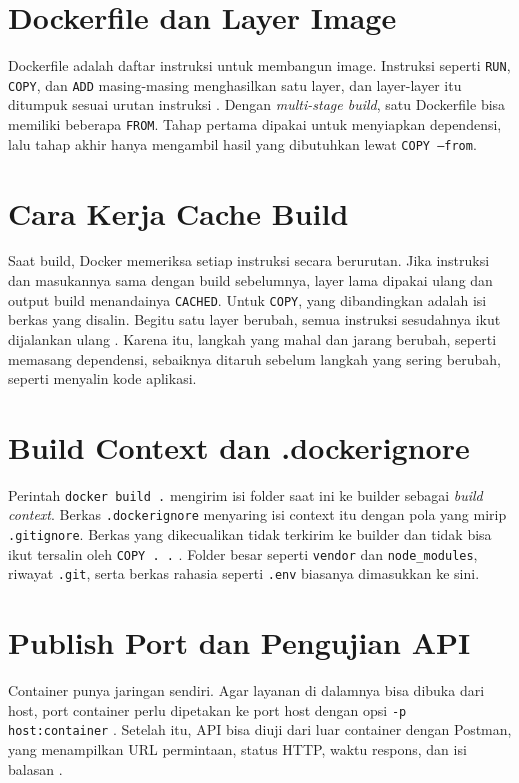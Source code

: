 \documentclass[a4paper,oneside,12pt]{report}
\begin{document}
\section{Dockerfile dan Layer Image}
Dockerfile adalah daftar instruksi untuk membangun image. Instruksi seperti \texttt{RUN}, \texttt{COPY}, dan \texttt{ADD} masing-masing menghasilkan satu layer, dan layer-layer itu ditumpuk sesuai urutan instruksi \cite{dockerfile-ref}. Dengan \textit{multi-stage build}, satu Dockerfile bisa memiliki beberapa \texttt{FROM}. Tahap pertama dipakai untuk menyiapkan dependensi, lalu tahap akhir hanya mengambil hasil yang dibutuhkan lewat \texttt{COPY --from}.

\section{Cara Kerja Cache Build}
Saat build, Docker memeriksa setiap instruksi secara berurutan. Jika instruksi dan masukannya sama dengan build sebelumnya, layer lama dipakai ulang dan output build menandainya \texttt{CACHED}. Untuk \texttt{COPY}, yang dibandingkan adalah isi berkas yang disalin. Begitu satu layer berubah, semua instruksi sesudahnya ikut dijalankan ulang \cite{docker-cache}. Karena itu, langkah yang mahal dan jarang berubah, seperti memasang dependensi, sebaiknya ditaruh sebelum langkah yang sering berubah, seperti menyalin kode aplikasi.

\section{Build Context dan .dockerignore}
Perintah \texttt{docker build .} mengirim isi folder saat ini ke builder sebagai \textit{build context}. Berkas \texttt{.dockerignore} menyaring isi context itu dengan pola yang mirip \texttt{.gitignore}. Berkas yang dikecualikan tidak terkirim ke builder dan tidak bisa ikut tersalin oleh \texttt{COPY . .} \cite{docker-context}. Folder besar seperti \texttt{vendor} dan \texttt{node\_modules}, riwayat \texttt{.git}, serta berkas rahasia seperti \texttt{.env} biasanya dimasukkan ke sini.

\section{Publish Port dan Pengujian API}
Container punya jaringan sendiri. Agar layanan di dalamnya bisa dibuka dari host, port container perlu dipetakan ke port host dengan opsi \texttt{-p host:container} \cite{docker-ports}. Setelah itu, API bisa diuji dari luar container dengan Postman, yang menampilkan URL permintaan, status HTTP, waktu respons, dan isi balasan \cite{postman-request}.
\end{document}
